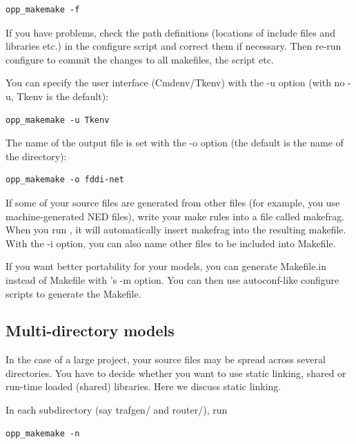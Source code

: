 \begin{Verbatim}
opp_makemake -f
\end{Verbatim}

If you have problems, check the path definitions (locations of include
files and libraries etc.) in the configure script and correct them if necessary. Then re-run configure to
commit the changes to all makefiles, the  script
etc.


You can specify the user interface (Cmdenv/Tkenv) with the -u option
(with no -u, Tkenv is the default):

\begin{Verbatim}
opp_makemake -u Tkenv
\end{Verbatim}

The name of the output file is set with the -o
option (the default is the name of the directory):

\begin{Verbatim}
opp_makemake -o fddi-net
\end{Verbatim}

If some of your source files are generated from other files (for
example, you use machine-generated NED files), write your make rules
into a file called makefrag. When you run , it
will automatically insert makefrag into the resulting makefile.  With
the -i option, you can also name other files to be included into
Makefile.


If you want better portability for your models, you can generate
Makefile.in instead of Makefile with 's -m
option. You can then use autoconf-like configure scripts to generate
the Makefile.





\subsection{Multi-directory models}

In the case of a large project, your source files may be spread across
several directories. You have to decide whether you want to use static
linking, shared or run-time loaded (shared)
libraries. Here we discuss static linking.


In each subdirectory (say trafgen/ and router/), run

\begin{Verbatim}
opp_makemake -n
\end{Verbatim}

